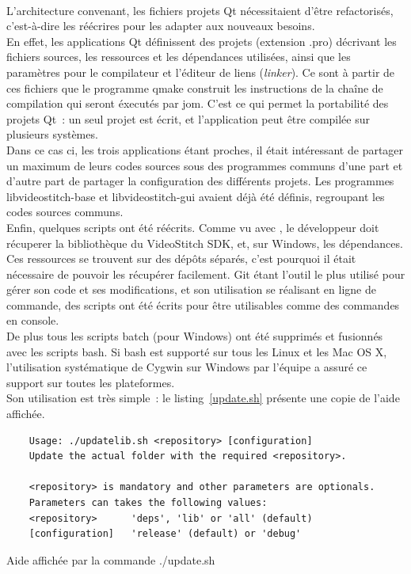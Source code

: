 \ \\
L'architecture convenant, les fichiers projets Qt nécessitaient d'être refactorisés,
c'est-à-dire les réécrires pour les adapter aux nouveaux besoins. \\
En effet, les applications Qt définissent des projets (extension .pro) décrivant
les fichiers sources, les ressources et les dépendances utilisées, ainsi que les
paramètres pour le compilateur et l'éditeur de liens (\textit{linker}). Ce sont à 
partir de ces fichiers que le programme qmake construit les instructions de la chaîne
de compilation qui seront éxecutés par jom\cite{qt}. C'est ce qui permet la portabilité
des projets Qt~: un seul projet est écrit, et l'application peut être compilée sur
plusieurs systèmes.\\
Dans ce cas ci, les trois applications étant proches, il était intéressant de partager un maximum de leurs
codes sources sous des programmes communs d'une part et d'autre part de partager
la configuration des différents projets. Les programmes libvideostitch-base et libvideostitch-gui
avaient déjà été définis, regroupant les codes sources communs. 
\ \\
\newline
Enfin, quelques scripts ont été réécrits. Comme vu avec , le
développeur doit récuperer la bibliothèque du VideoStitch SDK, et, sur Windows,
les dépendances. Ces ressources se trouvent sur des dépôts séparés, c'est pourquoi
il était nécessaire de pouvoir les récupérer facilement. Git étant l'outil le plus
utilisé pour gérer son code et ses modifications, et son utilisation se réalisant en ligne de commande,
des scripts ont été écrits pour être utilisables comme des commandes en console.\\
De plus tous les scripts batch (pour Windows) ont été supprimés et fusionnés avec
les scripts bash. Si bash est supporté sur tous les Linux et les Mac OS X,
l'utilisation systématique de Cygwin sur Windows par l'équipe a assuré ce support
sur toutes les plateformes.\\
Son utilisation est très simple~: le listing~\ref{update.sh} présente une copie de l'aide affichée.
\begin{listing}
  \begin{verbatim}
    Usage: ./updatelib.sh <repository> [configuration]
    Update the actual folder with the required <repository>.

    <repository> is mandatory and other parameters are optionals.
    Parameters can takes the following values:
    <repository>      'deps', 'lib' or 'all' (default)
    [configuration]   'release' (default) or 'debug'
  \end{verbatim}
  \caption{Aide affichée par la commande ./update.sh}
  \label{update.sh}
\end{listing}
